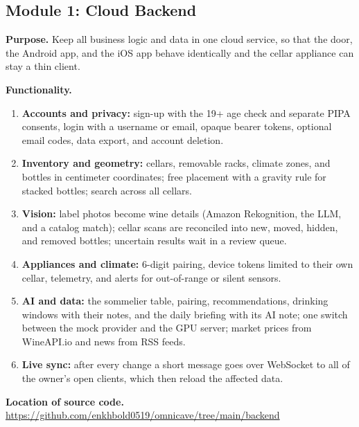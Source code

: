 \documentclass[conference]{IEEEtran}
\begin{document}
\subsection{Module 1: Cloud Backend}
\textbf{Purpose.} Keep all business logic and data in one cloud service, so that the door, the Android app, and the iOS app behave identically and the cellar appliance can stay a thin client.

\textbf{Functionality.}
\begin{enumerate}
    \item \textbf{Accounts and privacy:} sign-up with the 19+ age check and separate PIPA consents, login with a username or email, opaque bearer tokens, optional email codes, data export, and account deletion.
    \item \textbf{Inventory and geometry:} cellars, removable racks, climate zones, and bottles in centimeter coordinates; free placement with a gravity rule for stacked bottles; search across all cellars.
    \item \textbf{Vision:} label photos become wine details (Amazon Rekognition, the LLM, and a catalog match); cellar scans are reconciled into new, moved, hidden, and removed bottles; uncertain results wait in a review queue.
    \item \textbf{Appliances and climate:} 6-digit pairing, device tokens limited to their own cellar, telemetry, and alerts for out-of-range or silent sensors.
    \item \textbf{AI and data:} the sommelier table, pairing, recommendations, drinking windows with their notes, and the daily briefing with its AI note; one switch between the mock provider and the GPU server; market prices from WineAPI.io and news from RSS feeds.
    \item \textbf{Live sync:} after every change a short message goes over WebSocket to all of the owner's open clients, which then reload the affected data.
\end{enumerate}

\textbf{Location of source code.} \url{https://github.com/enkhbold0519/omnicave/tree/main/backend}
\end{document}
